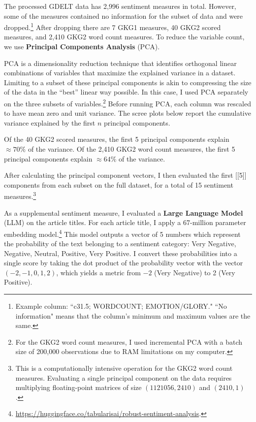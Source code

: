 \documentclass[12pt]{article}
\begin{document}
The processed GDELT data has 2,996 sentiment measures in total. However, some of the measures contained no information for the subset of data and were dropped.\footnote{Example column: ``c31.5; WORDCOUNT; EMOTION/GLORY." ``No information" means that the column's minimum and maximum values are the same.} After dropping there are 7 GKG1 measures, 40 GKG2 scored measures, and 2,410 GKG2 word count
measures. To reduce the variable count, we use \textbf{Principal Components Analysis} (PCA).

PCA is a dimensionality reduction technique that identifies orthogonal linear combinations of variables that maximize the explained variance in a dataset. Limiting to a subset of these principal components is akin to compressing the size of the data in the ``best'' linear way possible. In this case, I used PCA separately on the three subsets of variables.\footnote{For the GKG2 word count measures, I used incremental PCA with a batch size of 200,000 observations due to RAM limitations on my computer.} Before running PCA, each column was rescaled to have mean zero and unit variance. The scree plots below report the cumulative variance explained by the first $n$ principal components.

Of the 40 GKG2 scored measures, the first 5 principal components explain $\approx 70\%$ of the variance. Of the 2,410 GKG2 word count measures, the first 5 principal components explain $\approx 64\%$ of the variance.

After calculating the principal component vectors, I then evaluated the first [[5]] components from each subset on the full dataset, for a total of 15 sentiment measures.\footnote{This is a computationally intensive operation for the GKG2 word count measures. Evaluating a single principal component on the data requires multiplying floating-point matrices of size $(1121056,2410)$ and $(2410,1)$.}

As a supplemental sentiment measure, I evaluated a \textbf{Large Language Model} (LLM) on the article titles. For each article title, I apply a 67-million parameter embedding model.\footnote{\url{https://huggingface.co/tabularisai/robust-sentiment-analysis}.} This model outputs a vector of 5 numbers which represent the probability of the text belonging to a sentiment category: Very Negative, Negative, Neutral, Positive, Very Positive. I convert these probabilities into a single score by taking the dot product of the probability vector with the vector $(-2,-1,0,1,2)$, which yields a metric from $-2$ (Very Negative) to 2 (Very Positive).
\end{document}
